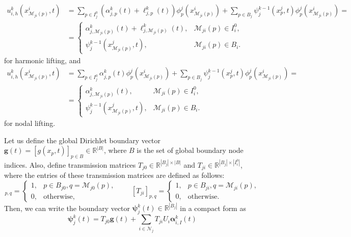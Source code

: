\documentclass[a4paper, 11pt]{article}
\theoremstyle{remark}
\begin{document}
\begin{align*}
    u^{k}_{i, h}(x^{i}_{\mathcal{M}_{ji}(p)}, t) &= \sum_{p\in I^{0}_{j}}\left(\alpha_{j, p}^{k}(t) + \ell_{j, p}^{k}(t)\right)\phi_{p}^{j}(x^{i}_{\mathcal{M}_{ji}(p)}) + \sum_{p\in B_{j}}\psi_{j}^{k-1}(x^{j}_{p}, t)\phi_{p}^{j}(x^{i}_{\mathcal{M}_{ji}(p)}) =\\ 
    &=
    \begin{cases}
    \alpha_{j, \mathcal{M}_{ji}(p)}^{k}(t) + \ell_{j, \mathcal{M}_{ji}(p)}^{k}(t), & \mathcal{M}_{ji}(p)\in I_{i}^{0},\\
    \psi_{j}^{k-1}(x^{j}_{\mathcal{M}_{ji}(p)}, t), & \mathcal{M}_{ji}(p)\in B_{i}.
    \end{cases}
\end{align*}
for harmonic lifting, and
\begin{align*}
    u_{i, h}^{k}(x^{i}_{\mathcal{M}_{ji}(p)}, t) &= \sum_{p\in I^{0}_{j}} \alpha_{j, p}^{k}(t)\phi^{j}_{p}(x^{i}_{\mathcal{M}_{ji}(p)}) + \sum_{p\in B_{j}}\psi_{j}^{k-1}(x^{j}_{p}, t)\phi^{j}_{p}(x^{i}_{\mathcal{M}_{ji}(p)}) =\\
    &=
    \begin{cases}
    \alpha_{j, \mathcal{M}_{ji}(p)}^{k}(t), & \mathcal{M}_{ji}(p)\in I_{i}^{0},\\
    \psi_{j}^{k-1}(x^{j}_{\mathcal{M}_{ji}(p)}, t), & \mathcal{M}_{ji}(p)\in B_{i}.
    \end{cases}
\end{align*}
for nodal lifting. 

Let us define the global Dirichlet boundary vector $\boldsymbol{g}(t) = [g(x_{p}, t)]_{p\in B}\in\mathbb{R}^{|B|}$, where $B$ is the set of global 
boundary node indices. Also, define transmission matrices $T_{j0}\in\mathbb{R}^{|B_j|\times |B|}$ and $T_{ji}\in \mathbb{R}^{|B_j|\times |I_{i}^{0}|}$, 
where the entries of these transmission matrices are defined as follows:
\begin{equation*}
    [T_{j0}]_{p, q} = 
    \begin{cases}
        1, & p\in B_{j0}, q = \mathcal{M}_{j0}(p),\\
        0, & \text{otherwise},
    \end{cases}\qquad
    [T_{ji}]_{p, q} = 
    \begin{cases}
        1, & p\in B_{ji}, q = \mathcal{M}_{ji}(p),\\
        0, & \text{otherwise}.
    \end{cases}
\end{equation*}
Then, we can write the boundary vector $\boldsymbol{\psi}_{j}^{k}(t)\in \mathbb{R}^{|B_j|}$ in a compact form as
\begin{equation*}
    \boldsymbol{\psi}_{j}^{k}(t) = T_{j0}\boldsymbol{g}(t) + \sum_{i\in\mathcal{N}_{j}}T_{ji}U_{i}\boldsymbol{\alpha}_{i, I}^{k}(t)
\end{equation*}
\end{document}
